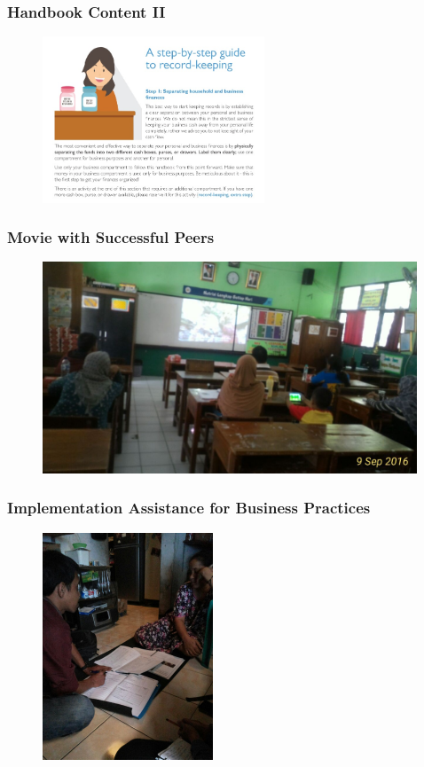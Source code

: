 \documentclass[hideothersubsections, usenames,dvipsnames,10pt]{beamer}
\begin{document}
\begin{frame}
\frametitle{Handbook Content II}

\begin{figure}[htbp]
	\centering
		\includegraphics[width=2.6in]{pics/Handbook_stepbystep.jpg}
	
	\label{height}
\end{figure}
\end{frame}

\begin{frame}
\frametitle{Movie with Successful Peers}
\begin{figure}[htbp]
	\centering
		\includegraphics[width=4.4in]{pics/movie.jpg}
   
	\label{height}
\end{figure}
\end{frame}


\begin{frame}
\frametitle{Implementation Assistance for Business Practices}
\begin{figure}[htbp]
	\centering
		\includegraphics[width=2.0in]{pics/Assistance_expl.jpg}
	
	\label{height}
\end{figure}
\end{frame}
\end{document}
